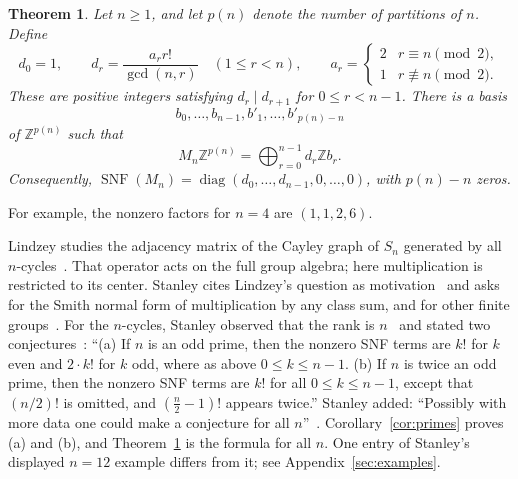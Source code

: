\documentclass[11pt]{article}
\newtheorem{theorem}{Theorem}[section]
\theoremstyle{remark}
\newcommand{\Z}{\mathbb{Z}}
\newcommand{\diag}{\operatorname{diag}}
\newcommand{\SNF}{\operatorname{SNF}}
\begin{document}
\begin{theorem}\label{thm:main}
Let $n\geq1$, and let $p(n)$ denote the number of partitions of $n$.
Define
\begin{equation}\label{eq:d}
 d_0=1,\qquad
 d_r=\frac{a_r r!}{\gcd(n,r)}\quad(1\leq r<n),\qquad
 a_r=\begin{cases}2&r\equiv n\pmod2,\\1&r\not\equiv n\pmod2.\end{cases}
\end{equation}
These are positive integers satisfying $d_r\mid d_{r+1}$ for
$0\leq r<n-1$. There is a basis
\[
 b_0,\ldots,b_{n-1},b'_1,\ldots,b'_{p(n)-n}
\]
of $\Z^{p(n)}$ such that
\begin{equation}\label{eq:image}
 M_n\Z^{p(n)}=\bigoplus_{r=0}^{n-1}d_r\Z b_r.
\end{equation}
Consequently,
$\SNF(M_n)=\diag(d_0,\ldots,d_{n-1},0,\ldots,0)$,
with $p(n)-n$ zeros.
\end{theorem}

For example, the nonzero factors for $n=4$ are $(1,1,2,6)$.

Lindzey studies the adjacency matrix of the Cayley graph of $S_n$
generated by all $n$-cycles~\cite[opening paragraph]{Lindzey}. That
operator acts on the full group algebra; here multiplication is
restricted to its center. Stanley cites Lindzey's question as
motivation~\cite[opening paragraph]{StanleyQuestion} and asks for the
Smith normal form of multiplication by any class sum, and for other
finite groups~\cite[opening and final paragraphs]{StanleyQuestion}.
For the $n$-cycles, Stanley observed that the rank is
$n$~\cite[paragraph preceding the two specific conjectures]{StanleyQuestion}
and stated two conjectures~\cite[conjectures (a) and (b)]{StanleyQuestion}:
``(a) If $n$ is an odd prime, then the nonzero SNF terms are $k!$ for $k$
even and $2\cdot k!$ for $k$ odd, where as above $0\leq k\leq n-1$.
(b) If $n$ is twice an odd prime, then the nonzero SNF terms are $k!$ for
all $0\leq k\leq n-1$, except that $(n/2)!$ is omitted, and
$(\frac n2-1)!$ appears twice.'' Stanley added: ``Possibly with more data one
could make a conjecture for all $n$''~\cite[paragraph following
conjecture (b)]{StanleyQuestion}. Corollary~\ref{cor:primes} proves (a)
and (b), and Theorem~\ref{thm:main} is the formula for all $n$. One entry
of Stanley's displayed $n=12$ example differs from it;
see Appendix~\ref{sec:examples}.
\end{document}
